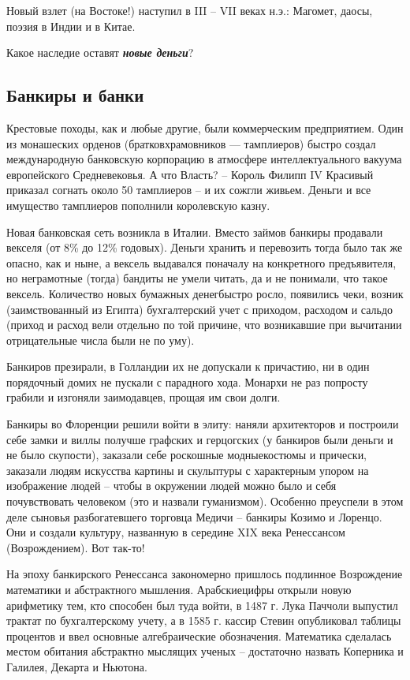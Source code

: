 Новый взлет (на Востоке!) наступил в III – VII веках н.э.: Магомет, даосы, поэзия в Индии и в Китае.


Какое наследие оставят \textbf{\textit{новые деньги}}?

\subsection[Банкиры и банки]{Банкиры и банки}

Крестовые походы, как и любые другие, были коммерческим предприятием. Один из монашеских орденов
(\flqq братков\frqq храмовников — тамплиеров) быстро создал международную банковскую корпорацию в
атмосфере интеллектуального вакуума европейского Средневековья. А что Власть? – Король Филипп
\foreignlanguage{english}{IV} Красивый приказал согнать около 50 тамплиеров – и их сожгли живьем. Деньги и все
имущество тамплиеров пополнили королевскую казну.


Новая банковская сеть возникла в Италии. Вместо займов банкиры продавали векселя (от 8\% до 12\% годовых). Деньги
хранить и перевозить тогда было так же опасно, как и ныне, а вексель выдавался поначалу на конкретного предъявителя, но
неграмотные (тогда) бандиты не умели читать, да и не понимали, что такое вексель. Количество новых бумажных
\flqq денег\frqq быстро росло, появились чеки, возник (заимствованный из Египта) бухгалтерский учет
с приходом, расходом и сальдо (приход и расход вели отдельно по той причине, что возникавшие при вычитании
отрицательные числа были не по уму).


Банкиров презирали, в Голландии их не допускали к причастию, ни в один \flqq порядочный дом\frqq их
не пускали с парадного хода. Монархи не раз попросту грабили и изгоняли заимодавцев, прощая им свои долги.


Банкиры во Флоренции решили \flqq войти в элиту\frqq: наняли архитекторов и построили себе замки и
виллы получше графских и герцогских (у банкиров были деньги и не было скупости), заказали себе роскошные
\flqq модные\frqq костюмы и прически, заказали людям искусства картины и скульптуры с характерным
упором на изображение людей – чтобы в окружении людей можно было и себя почувствовать человеком (это и назвали
\flqq гуманизмом\frqq). Особенно преуспели в этом деле сыновья разбогатевшего торговца Медичи –
банкиры Козимо и Лоренцо. Они и создали культуру, названную в середине \foreignlanguage{english}{XIX} века Ренессансом
(Возрождением). Вот так-то!


На эпоху банкирского Ренессанса закономерно пришлось подлинное Возрождение математики и абстрактного мышления.
\flqq Арабские\frqq цифры открыли новую арифметику тем, кто способен был туда войти, в 1487 г. Лука
Паччоли выпустил трактат по бухгалтерскому учету, а в 1585 г. кассир Стевин опубликовал таблицы процентов и ввел
основные алгебраические обозначения. Математика сделалась местом обитания абстрактно мыслящих ученых – достаточно
назвать Коперника и Галилея, Декарта и Ньютона.



